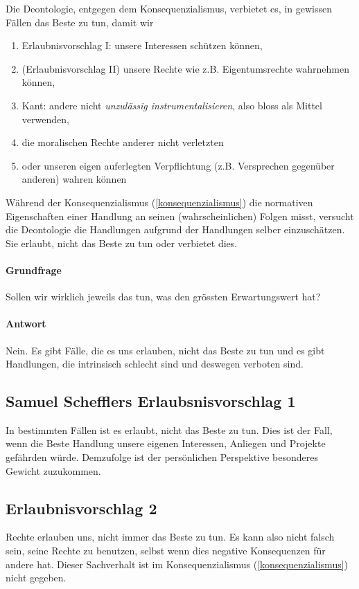 \documentclass[../main.tex]{subfiles}
\begin{document}
\begin{warningbox}
Die Deontologie, entgegen dem Konsequenzialismus, verbietet es, in gewissen Fällen das Beste zu tun, damit wir 
\begin{enumerate}[label=(\alph*)]
	\item Erlaubnisvorschlag I: unsere Interessen schützen können,
	\item (Erlaubnisvorschlag II) unsere Rechte wie z.B. Eigentumsrechte wahrnehmen können,
	\item Kant: andere nicht \textit{unzulässig instrumentalisieren}, also bloss als Mittel verwenden,
	\item die moralischen Rechte anderer nicht verletzten
	\item oder unseren eigen auferlegten Verpflichtung (z.B. Versprechen gegenüber anderen) wahren können
\end{enumerate}

\end{warningbox}

Während der Konsequenzialismus (\ref{konsequenzialismus}) die normativen Eigenschaften einer Handlung an seinen (wahrscheinlichen) Folgen misst, versucht die Deontologie die Handlungen aufgrund der Handlungen selber einzuschätzen. Sie erlaubt, nicht das Beste zu tun oder verbietet dies. 

\paragraph{Grundfrage} Sollen wir wirklich jeweils das tun, was den grössten Erwartungswert hat?

\paragraph{Antwort} Nein. Es gibt Fälle, die es uns erlauben, nicht das Beste zu tun und es gibt Handlungen, die intrinsisch schlecht sind und deswegen verboten sind. 

\subsection{Samuel Schefflers Erlaubsnisvorschlag 1}
In bestimmten Fällen ist es erlaubt, nicht das Beste zu tun. Dies ist der Fall, wenn die Beste Handlung unsere eigenen Interessen, Anliegen und Projekte gefährden würde. Demzufolge ist der persönlichen Perspektive besonderes Gewicht zuzukommen. 

\subsection{Erlaubnisvorschlag 2}
Rechte erlauben uns, nicht immer das Beste zu tun. Es kann also nicht falsch sein, seine Rechte zu benutzen, selbst wenn dies negative Konsequenzen für andere hat. Dieser Sachverhalt ist im Konsequenzialismus (\ref{konsequenzialismus}) nicht gegeben. 
\end{document}

